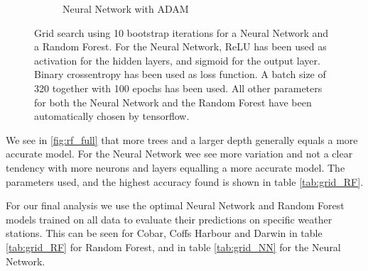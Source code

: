 \documentclass[11pt]{article}
\begin{document}
\begin{figure}[H]
\begin{subfigure}{.5\textwidth}
        \caption{Neural Network with ADAM}
        \label{fig:NN_full}
    \end{subfigure}
    \caption{Grid search using 10 bootstrap iterations for a Neural Network and a Random Forest. For the Neural Network, ReLU has been used as activation for the hidden layers, and sigmoid for the output layer. Binary crossentropy has been used as loss function. A batch size of 320 together with 100 epochs has been used. All other parameters for both the Neural Network and the Random Forest have been automatically chosen by tensorflow.}
    \label{fig:grid_full}
\end{figure}

We see in \ref{fig:rf_full} that more trees and a larger depth generally equals a more accurate model. For the Neural Network wee see more variation and not a clear tendency with more neurons and layers equalling a more accurate model. The parameters used, and the highest accuracy found is shown in table \ref{tab:grid_RF}.

For our final analysis we use the optimal Neural Network and Random Forest models trained on all data to evaluate their predictions on specific weather stations. This can be seen for Cobar, Coffs Harbour and Darwin in table \ref{tab:grid_RF} for Random Forest, and in table \ref{tab:grid_NN} for the Neural Network.
\end{document}

